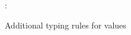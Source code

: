 \begin{figure}
\flushleft {}
\begin{smathpar}
{
   \vdash \exClosure{\rho}{\delta}{\sigma}: 
}
\end{smathpar}
\caption{Additional typing rules for values}
\end{figure}
